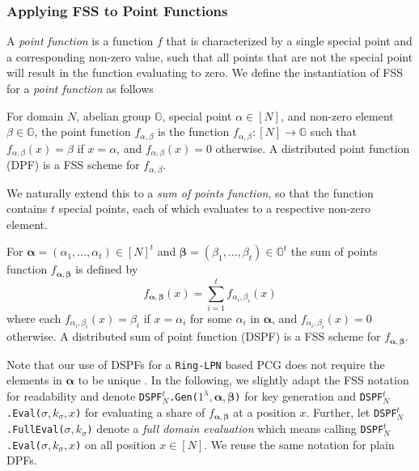 \subsubsection{Applying FSS to Point Functions}
A \textit{point function} is a function \(f\) that is characterized by a single special point and a corresponding non-zero value, such that all points that are not the special point will result in the function evaluating to zero. We define the instantiation of FSS for a \textit{point function} as follows

\begin{definition}
For domain $N$, abelian group $\mathbb{G}$, special point $\alpha \in [N]$, and non-zero element $\beta \in \mathbb{G}$, the point function $f_{\alpha, \beta}$ is the function $f_{\alpha, \beta}: [N] \rightarrow \mathbb{G}$ such that $f_{\alpha, \beta}(x) = \beta$ if $x = \alpha$, and $f_{\alpha, \beta}(x) = 0$ otherwise. A distributed point function (DPF) is a FSS scheme for $f_{\alpha, \beta}$.
\end{definition}

We naturally extend this to a \textit{sum of points function}, so that the function contains $t$ special points, each of which evaluates to a respective non-zero element.

\begin{definition}
\label{def:dspf}
For $\bm{\alpha} = (\alpha_1,...,\alpha_t) \in [N]^t$ and $\bm{\beta} = (\beta_1,...,\beta_t) \in \mathbb{G}^t$ the sum of points function $f_{\bm{\alpha}, \bm{\beta}}$ is defined by
$$
f_{\bm{\alpha}, \bm{\beta}}(x) = \sum_{i=1}^{t} f_{\alpha_i,\beta_i}(x)
$$
where each \( f_{\alpha_i,\beta_i}(x) = \beta_i \) if \( x = \alpha_i \) for some \( \alpha_i \) in \( \bm{\alpha} \), and \( f_{\alpha_i,\beta_i}(x) = 0 \) otherwise. A distributed sum of point function (DSPF) is a FSS scheme for $f_{\bm{\alpha}, \bm{\beta}}$.
\end{definition}

Note that our use of DSPFs for a \texttt{Ring-LPN} based PCG does not require the elements in $\bm{\alpha}$ to be unique \cite{boyle2020efficient}. In the following, we slightly adapt the FSS notation for readability and denote \texttt{DSPF$^t_N$.Gen($1^\lambda, \bm{\alpha}, \bm{\beta}$)} for key generation and \texttt{DSPF$^t_N$.Eval($\sigma, k_\sigma, x$)} for evaluating a share of $f_{\bm{\alpha}, \bm{\beta}}$ at a position $x$. Further, let \texttt{DSPF$^t_N$.FullEval($\sigma, k_\sigma$)} denote a \textit{full domain evaluation} which means calling \texttt{DSPF$^t_N$.Eval($\sigma, k_\sigma, x$)} on all position $x \in [N]$. We reuse the same notation for plain DPFs.

